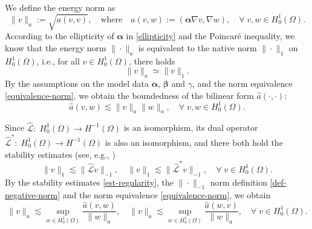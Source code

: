 \documentclass[preprint,times]{elsarticle}%
\numberwithin{algorithm}{section}
\numberwithin{equation}{section}
\newcommand{\anorm}[1]{\|#1\|_a}
\newcommand{\valpha}{\boldsymbol{\alpha}}
\newcommand{\vbeta}{\boldsymbol{\beta}}
\newcommand{\ha}{\hat{a}}
\newcommand{\hmcL}{\hat{\mathcal{L}}}
\newcommand{\Hon}[1]{\|#1\|_1}
\begin{document}
We define the energy norm as 
	\begin{equation}\label{norm-energy}
		\anorm{v} := \sqrt{a(v,v)}, \quad \text{where} \quad a(v,w) := (\valpha\nabla v,\nabla w), \quad \forall \; v,w \in H_0^1(\Omega). 
	\end{equation}
According to the ellipticity of $\valpha$ in \eqref{ellipticity} and the Poincar\'e inequality, we know that the energy norm $\anorm{\cdot}$ is equivalent to the native norm $\Hon{\cdot}$ on $H_0^1(\Omega)$, i.e., for all $v \in H_0^1(\Omega)$, there holds
\begin{equation}\label{equivalence-norm}
	 \anorm{v} \simeq \Hon{v}. 
\end{equation}
By the assumptions on the model data $\valpha,\,\vbeta$ and $\gamma$, and the norm equivalence \eqref{equivalence-norm}, we obtain the boundedness of the bilinear form $\hat{a}(\cdot,\cdot)$: 
    \begin{equation}\label{ha-boundedness}
		\ha(v,w) \lesssim \anorm{v}\anorm{w}, \quad \forall \; v,w \in H_0^1(\Omega). 
	\end{equation}

Since $\hmcL: \; H_0^1(\Omega) \rightarrow H^{-1}(\Omega)$ is an isomorphism, its dual operator $\hmcL^*: \; H_0^1(\Omega) \rightarrow H^{-1}(\Omega)$ is also an isomorphism, and there both hold the stability estimates (see, e.g., \cite{XuJC96:1759})
	\begin{equation}\label{est-regularity}
		\|v\|_1 \lesssim \|\hmcL v\|_{-1}, \quad \|v\|_1 \lesssim \|\hmcL^* v\|_{-1}, \quad \forall \; v \in H_0^1(\Omega).
	\end{equation}
By the stability estimates \eqref{est-regularity}, the $\|\cdot\|_{-1}$ norm definition \eqref{def-negative-norm} and the norm equivalence \eqref{equivalence-norm}, we obtain 
	\begin{equation}\label{infsup-VP}
		\anorm{v} \lesssim \sup_{w \in H_0^1(\Omega)}\frac{\ha(v,w)}{\anorm{w}}, \quad \anorm{v} \lesssim \sup_{w \in H_0^1(\Omega)}\frac{\ha(w,v)}{\anorm{w}}, \quad \forall \; v \in H_0^1(\Omega). 
	\end{equation}
\end{document}
